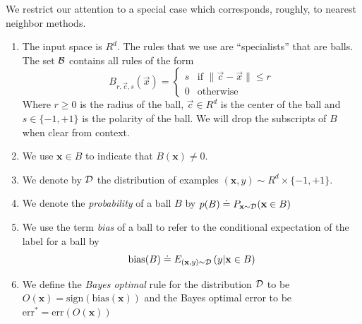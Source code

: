 \documentclass{article}
\newcommand{\err}{\mbox{err}}
\newcommand{\D}{{\cal D}}
\newcommand{\B}{{\cal B}}
\newcommand{\x}{\vec{x}}
\newcommand{\cc}{\vec{c}}
\renewcommand{\SS}{{\cal S}}
\newcommand{\vx}{\mathbf{x}}
\newcommand{\bias}{\text{bias}}
\newcommand{\ebias}{\widehat{\text{bias}}}
\newcommand{\eD}{\hat{\D}}
\newcommand{\ep}{\hat{p}}
\newcommand{\sign}{\text{sign}}
\begin{document}
We restrict our attention to a special case which corresponds,
roughly, to nearest neighbor methods.
\begin{enumerate}
  \item The input space is $R^d$.
    The rules that we use are ``specialists'' that are balls. The set
    $\B$ contains all rules of the form 
    \[
    B_{r,\cc,s}(\x) =
    \begin{cases}
      s & \text{if } \| \cc- \x \| \leq r \\
    0 & \text{otherwise }
    \end{cases}
    \]
    Where $r \geq 0$ is the radius of the ball, $\cc \in R^d$ is the
    center of the ball and $s \in \{-1,+1\}$ is the polarity of the ball.
    We will drop the subscripts of $B$ when clear from context.
  \item
    We use $\vx \in B$ to indicate that $B(\vx) \neq 0$.
  \item
    We denote by $\D$ the distribution of examples $(\vx,y) \sim R^d
    \times \{-1,+1\}$.
  \item
    We denote the {\em probability} of a ball $B$ by $p(B) \doteq
    P_{\vx \sim \D}(\vx \in B)$
  \item
    We use the term {\em bias} of a ball to refer to the conditional
    expectation of the label for a ball by
    $$
    \bias(B) \doteq E_{(\vx,y)\sim\D}\left( y|\vx \in B \right)
    $$

  \item
    We define the {\em Bayes optimal} rule for the distribution $\D$
    to be $O(\vx) = \sign(\bias(\vx))$ and the Bayes optimal error to
    be $\err^* = \err(O(\vx))$
\end{enumerate}

\newcommand{\edge}{\gamma}
\newcommand{\SepsGamSig}{\SS_{\epsilon,\edge}^{s}}
\newcommand{\SepsGam}{\SS_{\epsilon,\edge}}
\newcommand{\SepsGamMinusSig}{\SS_{\epsilon,\edge}^{-s}}
\end{document}
